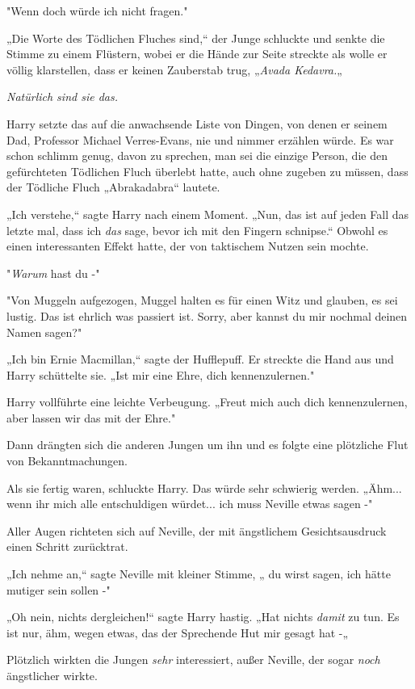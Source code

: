 {"Wenn doch würde ich nicht fragen."

„Die Worte des Tödlichen Fluches sind,“ der Junge schluckte und senkte die Stimme zu einem Flüstern, wobei er die Hände zur Seite streckte als wolle er völlig klarstellen, dass er keinen Zauberstab trug, „\emph{Avada Kedavra.}„

\emph{Natürlich sind sie das.}

Harry setzte das auf die anwachsende Liste von Dingen, von denen er seinem Dad, Professor Michael Verres-Evans, nie und nimmer erzählen würde. Es war schon schlimm genug, davon zu sprechen, man sei die einzige Person, die den gefürchteten Tödlichen Fluch überlebt hatte, auch ohne zugeben zu müssen, dass der Tödliche Fluch „Abrakadabra“ lautete.

„Ich verstehe,“ sagte Harry nach einem Moment. „Nun, das ist auf jeden Fall das letzte mal, dass ich \emph{das} sage, bevor ich mit den Fingern schnipse.“ Obwohl es einen interessanten Effekt hatte, der von taktischem Nutzen sein mochte.

"\emph{Warum} hast du -"

"Von Muggeln aufgezogen, Muggel halten es für einen Witz und glauben, es sei lustig. Das ist ehrlich was passiert ist. Sorry, aber kannst du mir nochmal deinen Namen sagen?"

„Ich bin Ernie Macmillan,“ sagte der Hufflepuff. Er streckte die Hand aus und Harry schüttelte sie. „Ist mir eine Ehre, dich kennenzulernen."

Harry vollführte eine leichte Verbeugung. „Freut mich auch dich kennenzulernen, aber lassen wir das mit der Ehre."

Dann drängten sich die anderen Jungen um ihn und es folgte eine plötzliche Flut von Bekanntmachungen.

Als sie fertig waren, schluckte Harry. Das würde sehr schwierig werden. „Ähm... wenn ihr mich alle entschuldigen würdet... ich muss Neville etwas sagen -"

Aller Augen richteten sich auf Neville, der mit ängstlichem Gesichtsausdruck einen Schritt zurücktrat.

„Ich nehme an,“ sagte Neville mit kleiner Stimme, „ du wirst sagen, ich hätte mutiger sein sollen -"

„Oh nein, nichts dergleichen!“ sagte Harry hastig. „Hat nichts \emph{damit} zu tun. Es ist nur, ähm, wegen etwas, das der Sprechende Hut mir gesagt hat -„

Plötzlich wirkten die Jungen \emph{sehr} interessiert, außer Neville, der sogar \emph{noch} ängstlicher wirkte.

}
